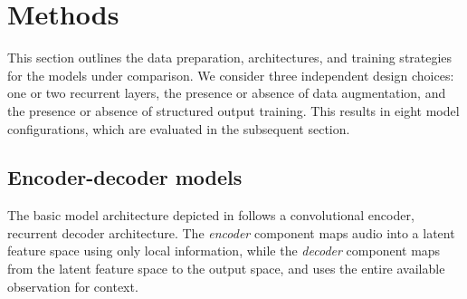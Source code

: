 \documentclass{article}
\begin{document}









\section{Methods}
\label{sec:methods}





This section outlines the data preparation, architectures, and training strategies for the models under comparison.
We consider three independent design choices: one or two recurrent layers, the presence or absence of data augmentation, and the presence or absence of structured output training.
This results in eight model configurations, which are evaluated in the subsequent section.

\subsection{Encoder-decoder models}

The basic model architecture depicted in  follows a convolutional encoder, recurrent decoder architecture.
The \emph{encoder} component maps audio into a latent feature space using only local information, while the \emph{decoder} component maps from the latent feature space to the output space, and uses the entire available observation for context.
\end{document}
